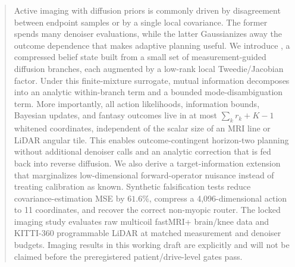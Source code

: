 \begin{abstract}
Active imaging with diffusion priors is commonly driven by disagreement
between endpoint samples or by a single local covariance.  The former spends
many denoiser evaluations, while the latter Gaussianizes away the outcome
dependence that makes adaptive planning useful.  We introduce \method, a
compressed belief state built from a small set of measurement-guided diffusion
branches, each augmented by a low-rank local Tweedie/Jacobian factor.  Under
this finite-mixture surrogate, mutual information decomposes into an analytic
within-branch term and a bounded mode-disambiguation term.  More importantly,
all action likelihoods, information bounds, Bayesian updates, and fantasy
outcomes live in at most $\sum_k r_k+K-1$ whitened coordinates, independent of
the scalar size of an MRI line or LiDAR angular tile.  This enables
outcome-contingent horizon-two planning without additional denoiser calls and
an analytic correction that is fed back into reverse diffusion.  We also
derive a target-information extension that marginalizes low-dimensional
forward-operator nuisance instead of treating calibration as known.  Synthetic
falsification tests reduce covariance-estimation MSE by $61.6\%$, compress a
4,096-dimensional action to 11 coordinates, and recover the correct
non-myopic router.  The locked imaging study evaluates raw multicoil
fastMRI+ brain/knee data and KITTI-360 programmable LiDAR at matched
measurement and denoiser budgets.  Imaging results in this working draft are
explicitly \pending{} and will not be claimed before the preregistered
patient/drive-level gates pass.
\end{abstract}

